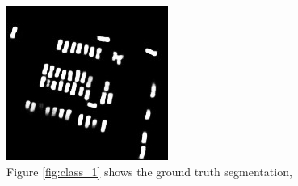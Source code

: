\documentclass{kththesis}
\begin{document}
\begin{figure}[H]
\endminipage\hfill
{}%
  \includegraphics[width=\linewidth]{gan_vs_class/gan_1}
\endminipage
\caption{Figure \ref{fig:class_1} shows the ground truth segmentation, }
\end{figure}
\end{document}
